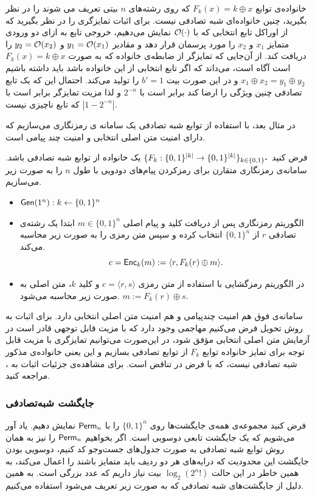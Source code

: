 \begin{example}
	خانواده‌ی توابع 
	$F_{k}(x) = k\oplus x$
 که روی رشته‌های 
	$n$
	بیتی تعریف می شوند را در نظر بگیرید، چنین خانواده‌ای شبه تصادفی نیست. برای اثبات تمایزگری را در نظر بگیرید که از اوراکل تابع انتخابی که با 
	${\mathcal O}(\cdot)$
	 نمایش می‌دهیم، خروجی تابع به ازای دو ورودی متمایز 
	 $x_{1}$
	 و
	 $x_{2}$
	 را مورد پرسمان قرار دهد و مقادیر 
	 $y_{1} = {\mathcal O}(x_{1})$
	 و
	 $y_{2} = {\mathcal O}(x_{2})$
	 را دریافت کند. از آن‌جایی که تمایزگر از ضابطه‌ی خانواده که به صورت 
	 $F_{k}(x) = k\oplus x$
	 است آگاه است، می‌داند که اگر تابع انتخابی از این خانواده باشد باید داشته باشیم 
	 $x_{1}\oplus x_{2} = y_{1}\oplus y_{2}$
	 و در این صورت بیت  
	 $b' = 1$
	 را تولید می‌کند. احتمال این که یک تابع تصادفی چنین ویژگی را ارضا کند برابر است با 
	 $2^{-n}$
	 و لذا مزیت تمایزگر برابر است با 
	 $|1-2^{-n}|$
	 که تابع ناچیزی نیست.
\end{example}
در مثال بعد، با استفاده از توابع شبه تصادفی یک سامانه ی رمزنگاری می‌سازیم  که دارای امنیت متن اصلی انتخابی
و امنیت چند پیامی است. 
\begin{example}
	\label{cpa-secure_example}
فرض کنید 
$\{F_{k}:\{0, 1\}^{|k|}\rightarrow \{0, 1\}^{|k|}\}_{k\in\{0, 1\}^{\ast}}$
یک خانواده از توابع شبه تصادفی باشد. سامانه‌ی رمزنگاری متقارن برای رمزکردن پیام‌های دودویی با طول 
$n$
را به صورت زیر می‌سازیم.
\begin{itemize}
\item
$\mathsf{Gen}(1^{n}): k\leftarrow\{0, 1\}^{n}$	
\item
الگوریتم رمزنگاری پس از دریافت کلید و پیام اصلی
$m\in\{0, 1\}^{n}$
 ابتدا یک رشته‌ی تصادفی 
 $r$
 از 
$\{0, 1\}^{n}$
انتخاب کرده و سپس متن رمزی را به صورت زیر محاسبه می‌کند.
$$c=\mathsf{Enc}_{k}(m) := \langle r, F_{k}(r)\oplus m\rangle.$$
\item
در الگوریتم رمزگشایی با استفاده از متن رمزی 
$c = \langle r, s\rangle$
و کلید 
$k$، 
 متن اصلی به صورت  زیر محاسبه می‌شود. 
$m := F_{k}(r)\oplus s$.
\end{itemize}
سامانه‌ی فوق هم امنیت چندپیامی و هم امنیت متن اصلی انتخابی دارد. برای اثبات به روش تحویل فرض می‌کنیم مهاجمی وجود دارد که با مزیت قابل توجهی قادر است در آزمایش متن اصلی انتخابی مؤفق شود، در این‌صورت می‌توانیم تمایزگری با مزیت قابل توجه  برای تمایز خانواده توابع 
$F_{k}$
از توابع تصادفی بسازیم و این یعنی خانواده‌ی مذکور شبه تصادفی نیست، که  با فرض در تناقض است. برای مشاهده‌ی جزئیات اثبات به 
{\small \cite[ص.۸۳]{katz2014introduction}}، 
مراجعه کنید. 
\end{example}
\subsubsection*{جایگشت شبه‌تصادفی}
فرض کنید مجموعه‌ی همه‌ی جایگشت‌ها  روی 
$\{0, 1\}^{n}$
را با 
$\mathsf{Perm}_{n}$
نمایش دهیم. یاد آور می‌شویم که یک جایگشت تابعی دوسویی 
است. اگر  بخواهیم 
$\mathsf{Perm}_{n}$
را نیز به همان روش توابع شبه تصادفی به صورت جدول‌های جست‌وجو کد کنیم، دوسویی بودن جایگشت این محدودیت که درایه‌های هر دو ردیف باید متمایز باشند را اعمال می‌کند، به همین خاطر در این حالت 
$\log_{2}(2^{n}!)$
بیت نیاز داریم که عدد بزرگی است. به همین دلیل از جایگشت‌های شبه تصادفی که به صورت زیر تعریف می‌شود استفاده می‌کنیم. 

